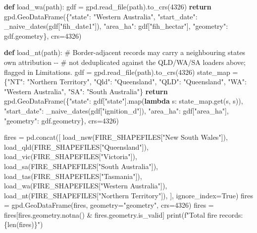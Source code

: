 \documentclass[
  letterpaper,
  DIV=11,
  numbers=noendperiod]{scrartcl}
\newenvironment{Shaded}{\begin{snugshade}}{\end{snugshade}}
\newcommand{\BuiltInTok}[1]{\textcolor[rgb]{0.00,0.23,0.31}{#1}}
\newcommand{\CommentTok}[1]{\textcolor[rgb]{0.37,0.37,0.37}{#1}}
\newcommand{\ControlFlowTok}[1]{\textcolor[rgb]{0.00,0.23,0.31}{\textbf{#1}}}
\newcommand{\DecValTok}[1]{\textcolor[rgb]{0.68,0.00,0.00}{#1}}
\newcommand{\KeywordTok}[1]{\textcolor[rgb]{0.00,0.23,0.31}{\textbf{#1}}}
\newcommand{\NormalTok}[1]{\textcolor[rgb]{0.00,0.23,0.31}{#1}}
\newcommand{\OperatorTok}[1]{\textcolor[rgb]{0.37,0.37,0.37}{#1}}
\newcommand{\SpecialCharTok}[1]{\textcolor[rgb]{0.37,0.37,0.37}{#1}}
\newcommand{\SpecialStringTok}[1]{\textcolor[rgb]{0.13,0.47,0.30}{#1}}
\newcommand{\StringTok}[1]{\textcolor[rgb]{0.13,0.47,0.30}{#1}}
\newcommand{\VariableTok}[1]{\textcolor[rgb]{0.07,0.07,0.07}{#1}}
\begin{document}
\begin{Shaded}
\begin{Highlighting}[]
\KeywordTok{def}\NormalTok{ load\_wa(path):}
\NormalTok{    gdf }\OperatorTok{=}\NormalTok{ gpd.read\_file(path).to\_crs(}\DecValTok{4326}\NormalTok{)}
    \ControlFlowTok{return}\NormalTok{ gpd.GeoDataFrame(\{}\StringTok{"state"}\NormalTok{: }\StringTok{"Western Australia"}\NormalTok{, }\StringTok{"start\_date"}\NormalTok{: \_naive\_dates(gdf[}\StringTok{"fih\_date1"}\NormalTok{]),}
                              \StringTok{"area\_ha"}\NormalTok{: gdf[}\StringTok{"fih\_hectar"}\NormalTok{], }\StringTok{"geometry"}\NormalTok{: gdf.geometry\}, crs}\OperatorTok{=}\DecValTok{4326}\NormalTok{)}

\KeywordTok{def}\NormalTok{ load\_nt(path):}
    \CommentTok{\# Border{-}adjacent records may carry a neighbouring state\textquotesingle{}s own attribution {-}{-}}
    \CommentTok{\# not deduplicated against the QLD/WA/SA loaders above; flagged in Limitations.}
\NormalTok{    gdf }\OperatorTok{=}\NormalTok{ gpd.read\_file(path).to\_crs(}\DecValTok{4326}\NormalTok{)}
\NormalTok{    state\_map }\OperatorTok{=}\NormalTok{ \{}\StringTok{"NT"}\NormalTok{: }\StringTok{"Northern Territory"}\NormalTok{, }\StringTok{"Qld"}\NormalTok{: }\StringTok{"Queensland"}\NormalTok{, }\StringTok{"QLD"}\NormalTok{: }\StringTok{"Queensland"}\NormalTok{,}
                 \StringTok{"WA"}\NormalTok{: }\StringTok{"Western Australia"}\NormalTok{, }\StringTok{"SA"}\NormalTok{: }\StringTok{"South Australia"}\NormalTok{\}}
    \ControlFlowTok{return}\NormalTok{ gpd.GeoDataFrame(\{}\StringTok{"state"}\NormalTok{: gdf[}\StringTok{"state"}\NormalTok{].}\BuiltInTok{map}\NormalTok{(}\KeywordTok{lambda}\NormalTok{ s: state\_map.get(s, s)),}
                              \StringTok{"start\_date"}\NormalTok{: \_naive\_dates(gdf[}\StringTok{"ignition\_d"}\NormalTok{]),}
                              \StringTok{"area\_ha"}\NormalTok{: gdf[}\StringTok{"area\_ha"}\NormalTok{], }\StringTok{"geometry"}\NormalTok{: gdf.geometry\}, crs}\OperatorTok{=}\DecValTok{4326}\NormalTok{)}

\NormalTok{fires }\OperatorTok{=}\NormalTok{ pd.concat([}
\NormalTok{    load\_nsw(FIRE\_SHAPEFILES[}\StringTok{"New South Wales"}\NormalTok{]), load\_qld(FIRE\_SHAPEFILES[}\StringTok{"Queensland"}\NormalTok{]),}
\NormalTok{    load\_vic(FIRE\_SHAPEFILES[}\StringTok{"Victoria"}\NormalTok{]), load\_sa(FIRE\_SHAPEFILES[}\StringTok{"South Australia"}\NormalTok{]),}
\NormalTok{    load\_tas(FIRE\_SHAPEFILES[}\StringTok{"Tasmania"}\NormalTok{]), load\_wa(FIRE\_SHAPEFILES[}\StringTok{"Western Australia"}\NormalTok{]),}
\NormalTok{    load\_nt(FIRE\_SHAPEFILES[}\StringTok{"Northern Territory"}\NormalTok{]),}
\NormalTok{], ignore\_index}\OperatorTok{=}\VariableTok{True}\NormalTok{)}
\NormalTok{fires }\OperatorTok{=}\NormalTok{ gpd.GeoDataFrame(fires, geometry}\OperatorTok{=}\StringTok{"geometry"}\NormalTok{, crs}\OperatorTok{=}\DecValTok{4326}\NormalTok{)}
\NormalTok{fires }\OperatorTok{=}\NormalTok{ fires[fires.geometry.notna() }\OperatorTok{\&}\NormalTok{ fires.geometry.is\_valid]}
\BuiltInTok{print}\NormalTok{(}\SpecialStringTok{f"Total fire records: }\SpecialCharTok{\{}\BuiltInTok{len}\NormalTok{(fires)}\SpecialCharTok{\}}\SpecialStringTok{"}\NormalTok{)}
\end{Highlighting}
\end{Shaded}
\end{document}
